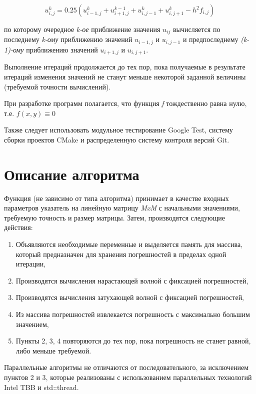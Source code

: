 \documentclass{report}
\begin{document}
{\large $${u^{k}_{i,j} = 0.25(u^{k}_{i-1,j} + u^{k-1}_{i+1,j} + u^{k}_{i,j-1} + u^{k}_{i,j+1} - h^{2}f_{i,j})}$$}

по которому очередное {\textit{k-ое}} приближение значения {\textit{$u_{ij}$}} вычисляется по последнему {\textit{k-ому}} приближению значений {\textit{$u_{i-1,j}$}} и {\textit{$u_{i,j-1}$}} и предпоследнему {\textit{(k-1)-ому}} приближению значений  {\textit{$u_{i+1,j}$}} и {\textit{$u_{i,j+1}$}}.
\par Выполнение итераций продолжается до тех пор, пока получаемые в результате итераций изменения значений
не станут меньше некоторой заданной величины (требуемой точности вычислений).
\par При разработке программ полагается, что функция {\textit{f}} тождественно равна нулю, т.е. $ {f(x,y) \equiv 0} $

\par Также следует использовать модульное тестирование Google Test, систему сборки проектов CMake и распределенную систему контроля версий Git.
\newpage

\section*{Описание алгоритма}
\par Функция (не зависимо от типа алгоритма) принимает в качестве входных параметров указатель на линейную матрицу {\textit{MxM}} с начальными значениями, требуемую точность и размер матрицы. Затем, производятся следующие действия:
\begin{enumerate}
\item Объявляются необходимые переменные и выделяется память для массива, который предназначен для хранения погрешностей в пределах одной итерации,
\item Производятся вычисления нарастающей волной с фиксацией погрешностей,
\item Производятся вычисления затухающей волной с фиксацией погрешностей,
\item Из массива погрешностей извлекается погрешность с максимально большим значением,
\item Пункты 2, 3, 4 повторяются до тех пор, пока погрешность не станет равной, либо меньше требуемой.
\end{enumerate}
\par Параллельные алгоритмы не отличаются от последовательного, за исключением пунктов 2 и 3, которые реализованы с использованием параллельных технологий Intel TBB и std::thread.
\newpage
\end{document}
